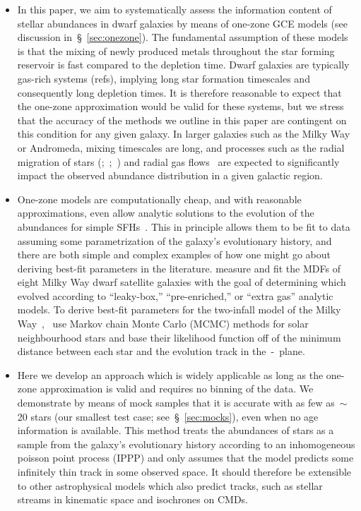 \documentclass[ms.tex]{subfiles}
\begin{document}
\begin{itemize}
	\item In this paper, we aim to systematically assess the information
	content of stellar abundances in dwarf galaxies by means of one-zone GCE
	models (see discussion in~\S~\ref{sec:onezone}).
	The fundamental assumption of these models is that the mixing of newly
	produced metals throughout the star forming reservoir is fast compared to
	the depletion time.
	Dwarf galaxies are typically gas-rich systems (refs), implying long star
	formation timescales and consequently long depletion times.
	It is therefore reasonable to expect that the one-zone approximation would
	be valid for these systems, but we stress that the accuracy of the methods
	we outline in this paper are contingent on this condition for any given
	galaxy.
	In larger galaxies such as the Milky Way or Andromeda, mixing timescales
	are long, and processes such as the radial migration of stars
	(\citealp{Sellwood2002, Schoenrich2009, Minchev2011};~\citealp*{Minchev2013,
	Minchev2014};~\citealp{Minchev2017, Johnson2021, Chen2022}) and radial gas
	flows~\citep{Lacey1985, Bilitewski2012, Vincenzo2018} are expected to
	significantly impact the observed abundance distribution in a given
	galactic region.

	\item One-zone models are computationally cheap, and with reasonable
	approximations, even allow analytic solutions to the evolution of the
	abundances for simple SFHs~\citep*[e.g.][]{Weinberg2017}.
	This in principle allows them to be fit to data assuming some
	parametrization of the galaxy's evolutionary history, and there are both
	simple and complex examples of how one might go about deriving best-fit
	parameters in the literature.
	\citet{Kirby2011} measure and fit the MDFs of eight Milky Way dwarf
	satellite galaxies with the goal of determining which evolved according to
	``leaky-box,'' ``pre-enriched,'' or ``extra gas'' analytic models.
	To derive best-fit parameters for the two-infall model of the Milky
	Way~\citep[e.g.][]{Chiappini1997},~\citet{Spitoni2020} use Markov chain
	Monte Carlo (MCMC) methods for solar neighbourhood stars and base their
	likelihood function off of the minimum distance between each star and the
	evolution track in the~\afe-\feh~plane.

	\item Here we develop an approach which is widely applicable as long as the
	one-zone approximation is valid and requires no binning of the data.
	We demonstrate by means of mock samples that it is accurate with as few
	as~$\sim$20 stars (our smallest test case; see~\S~\ref{sec:mocks}), even
	when no age information is available.
	This method treats the abundances of stars as a sample from the galaxy's
	evolutionary history according to an inhomogeneous poisson point process
	(IPPP) and only assumes that the model predicts some infinitely thin track
	in some observed space.
	It should therefore be extensible to other astrophysical models which also
	predict tracks, such as stellar streams in kinematic space and isochrones
	on CMDs.


\end{itemize}
\end{document}
